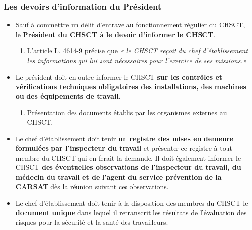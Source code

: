 \documentclass{beamer}
\begin{document}
\begin{frame}
\frametitle{Les devoirs d’information du Président}
\begin{itemize}
\item Sauf à commettre un délit d’entrave au fonctionnement régulier du CHSCT, le \textbf{Président du CHSCT à le devoir d’informer le CHSCT}. 
\begin{enumerate}
\item L’article L. 4614-9 précise que \textit{« le CHSCT reçoit du chef d’établissement les informations qui lui sont nécessaires pour l’exercice de ses missions.»}
\end{enumerate}
\item Le président doit en outre informer le CHSCT \textbf{sur les contrôles et vérifications techniques obligatoires des installations, des machines ou des équipements de travail.}

\begin{enumerate}
\item Présentation des documents établis par les organismes externes au CHSCT.
\end{enumerate}
\item Le chef d’établissement doit tenir\textbf{ un registre des mises en demeure formulées par l’inspecteur du travail} et présenter ce registre à tout membre du CHSCT qui en ferait la demande. Il doit également informer le CHSCT \textbf{des éventuelles observations de l’inspecteur du travail, du médecin du travail et de l’agent du service prévention de la CARSAT} dès la réunion suivant ces observations.

\item Le chef d’établissement doit tenir à la disposition des membres du CHSCT le \textbf{document unique} dans lequel il retranscrit les résultats de l'évaluation des risques pour la sécurité et la santé des travailleurs.
\end{itemize}
\end{frame}
\end{document}
